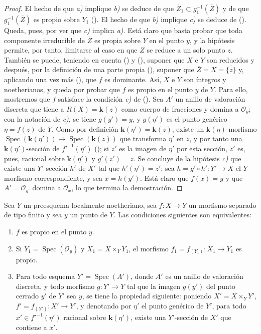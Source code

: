 \begin{proof}
El hecho de que \emph{a)} implique \emph{b)} se deduce de que $\overline Z_1\subset g_1^{-1}(\overline Z)$ y de que $g_1^{-1}(\overline Z)$ es propio sobre $Y_1$ ().
El hecho de que \emph{b)} implique \emph{c)} se deduce de ().
Queda, pues, por ver que \emph{c)} implica \emph{a)}.
Está claro que basta probar que toda componente irreducible de $\overline Z$ es propia sobre $Y$ en el punto $y$, y la hipótesis permite, por tanto, limitarse al caso en que $Z$ se reduce a un solo punto $z$.
También se puede, teniendo en cuenta () y (), suponer que $X$ e $Y$ son reducidos y después, por la definición de una parte propia (), suponer que $\overline Z=X=\overline{\{z\}}$ y, aplicando una vez más (), que $f$ es dominante. Así, $X$ e $Y$ son íntegros y noetherianos, y queda por probar que $f$ es propio en el punto $y$ de $Y$. Para ello, mostremos que $f$ satisface la condición \emph{c)} de ().
Sea $A'$ un anillo de valoración discreta que tiene a $R(X)=\boldsymbol{k}(z)$ como cuerpo de fracciones y domina a $\mathcal O_y$; con la notación de \emph{c)}, se tiene $g(y')=y$, y $g(\eta')$ es el punto genérico $\eta=f(z)$ de $Y$.
Como por definición $\boldsymbol{k}(\eta')=\boldsymbol{k}(z)$, existe un $\boldsymbol{k}(\eta)$-morfismo $\operatorname{Spec}(\boldsymbol{k}(\eta'))\to\operatorname{Spec}(\boldsymbol{k}(z))$ que transforma $\eta'$ en $z$, y por tanto una $\boldsymbol{k}(\eta')$-sección de $f'^{-1}(\eta')$ (); si $z'$ es la imagen de $\eta'$ por esta sección, $z'$ es, pues, racional sobre $\boldsymbol{k}(\eta')$ y $g'(z')=z$.
Se concluye de la hipótesis \emph{c)} que existe una $Y'$-sección $h'$ de $X'$ tal que $h'(\eta')=z'$; sea $h=g'\circ h':Y'\to X$ el $Y$-morfismo correspondiente, y sea $x=h(y')$. Está claro que $f(x)=y$ y que $A'=\mathcal O_{y'}$ domina a $\mathcal O_x$, lo que termina la demostración.
\end{proof}

\begin{corollary}[15.7.5]
\label{IV.15.7.5}
Sea $Y$ un preesquema localmente noetheriano, sea $f:X\to Y$ un morfismo separado de tipo finito y sea $y$ un punto de $Y$.
Las condiciones siguientes son equivalentes:
\begin{enumerate}[label=\emph{\alph*)}]
  \item $f$ es propio en el punto $y$.
  \item Si $Y_1=\operatorname{Spec}(\mathcal O_y)$ y $X_1=X\times_Y Y_1$, el morfismo $f_1=f_{(Y_1)}:X_1\to Y_1$ es propio.
  \item Para todo esquema $Y'=\operatorname{Spec}(A')$, donde $A'$ es un anillo de valoración discreta, y todo morfismo $g:Y'\to Y$ tal que la imagen $g(y')$ del punto cerrado $y'$ de $Y'$ sea $y$, se tiene la propiedad siguiente: poniendo $X'=X\times_Y Y'$, $f'=f_{(Y')}:X'\to Y'$, y denotando por $\eta'$ el punto genérico de $Y'$, para todo $x'\in f'^{-1}(\eta')$ racional sobre $\boldsymbol{k}(\eta')$, existe una $Y'$-sección de $X'$ que contiene a $x'$.
\end{enumerate}
\end{corollary}

